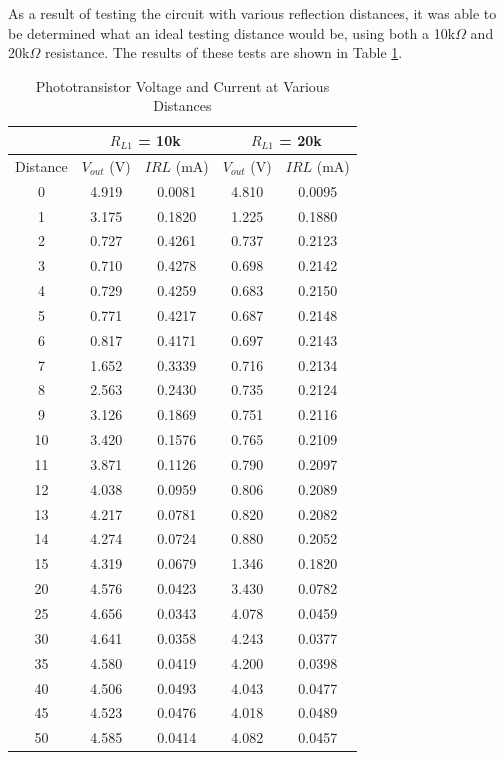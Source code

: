 \documentclass[conference]{IEEEtran}
\begin{document}

As a result of testing the circuit with various reflection distances, it was able to be
determined what an ideal testing distance would be, using both a 10k$\Omega$ and 20k$\Omega$ resistance. 
The results of these tests are shown in Table \ref{distanceVoltageCurrent}.

\begin{table}[H]
    \centering
    \caption{Phototransistor Voltage and Current at Various Distances}
    \label{distanceVoltageCurrent}
    \begin{tabular}{|c||c|c||c|c|}
        \hline
         & \multicolumn{2}{c||}{$R_{L1}$ = \textbf{10k}} & \multicolumn{2}{c|}{$R_{L1}$ = \textbf{20k}} \\
        \hline
        Distance & $V_{out}$ (V) & $IRL$ (mA) & $V_{out}$ (V) & $IRL$ (mA) \\
        \hline
        0 &  4.919 &  0.0081 & 4.810 & 0.0095 \\
        1 &  3.175 &  0.1820 & 1.225 & 0.1880 \\
        2 &  0.727 &  0.4261 & 0.737 & 0.2123 \\
        3 &  0.710 &  0.4278 & 0.698 & 0.2142 \\
        4 &  0.729 &  0.4259 & 0.683 & 0.2150 \\
        5 &  0.771 &  0.4217 & 0.687 & 0.2148 \\
        6 &  0.817 &  0.4171 & 0.697 & 0.2143 \\
        7 &  1.652 &  0.3339 & 0.716 & 0.2134 \\
        8 &  2.563 &  0.2430 & 0.735 & 0.2124 \\
        9 &  3.126 &  0.1869 & 0.751 & 0.2116 \\
        10 & 3.420 &  0.1576 & 0.765 & 0.2109 \\
        11 & 3.871 &  0.1126 & 0.790 & 0.2097 \\
        12 & 4.038 &  0.0959 & 0.806 & 0.2089 \\
        13 & 4.217 &  0.0781 & 0.820 & 0.2082 \\
        14 & 4.274 &  0.0724 & 0.880 & 0.2052 \\
        15 & 4.319 &  0.0679 & 1.346 & 0.1820 \\
        20 & 4.576 &  0.0423 & 3.430 & 0.0782 \\
        25 & 4.656 &  0.0343 & 4.078 & 0.0459 \\
        30 & 4.641 &  0.0358 & 4.243 & 0.0377 \\
        35 & 4.580 &  0.0419 & 4.200 & 0.0398 \\
        40 & 4.506 &  0.0493 & 4.043 & 0.0477 \\
        45 & 4.523 &  0.0476 & 4.018 & 0.0489 \\
        50 & 4.585 &  0.0414 & 4.082 & 0.0457 \\
        \hline
    \end{tabular}
\end{table}
\end{document}
